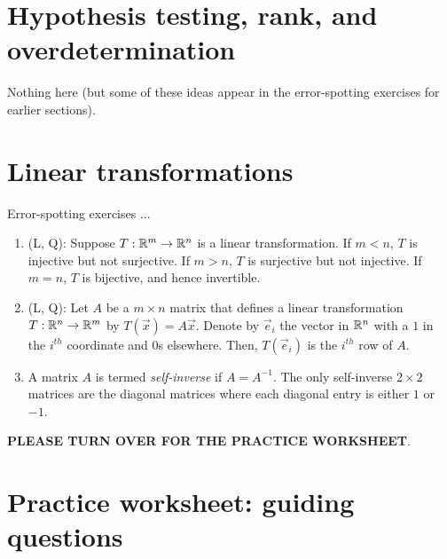 \documentclass[10pt]{amsart}
\begin{document}
\section{Hypothesis testing, rank, and overdetermination}

Nothing here (but some of these ideas appear in the error-spotting
exercises for earlier sections).

\section{Linear transformations}

Error-spotting exercises ...

\begin{enumerate}
\item (L, Q): Suppose $T: \mathbb{R}^m \to \mathbb{R}^n$ is a linear
  transformation. If $m < n$, $T$ is injective but not surjective. If
  $m > n$, $T$ is surjective but not injective. If $m = n$, $T$ is
  bijective, and hence invertible.
\item (L, Q): Let $A$ be a $m \times n$ matrix that defines a linear
  transformation $T: \mathbb{R}^n \to \mathbb{R}^m$ by $T(\vec{x}) = A\vec{x}$. Denote
  by $\vec{e}_i$ the vector in $\mathbb{R}^n$ with a $1$ in the $i^{th}$
  coordinate and $0$s elsewhere. Then, $T(\vec{e}_i)$ is the $i^{th}$
  row of $A$.
\item A matrix $A$ is termed {\em self-inverse} if $A = A^{-1}$. The
  only self-inverse $2 \times 2$ matrices are the diagonal matrices
  where each diagonal entry is either $1$ or $-1$.
\end{enumerate}

{\bf PLEASE TURN OVER FOR THE PRACTICE WORKSHEET}.

\newpage

\section{Practice worksheet: guiding questions}
\end{document}
